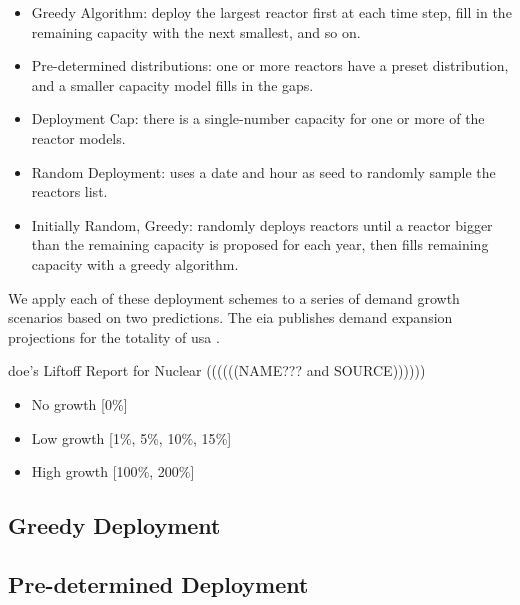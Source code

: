 \begin{itemize}
    \item Greedy Algorithm: deploy the largest reactor first at each time step, fill in the remaining capacity with the next smallest, and so on.
    \item Pre-determined distributions: one or more reactors have a preset distribution, and a smaller capacity model fills in the gaps.
    \item Deployment Cap: there is a single-number capacity for one or more of the reactor models.
    \item Random Deployment: uses a date and hour as seed to randomly sample the reactors list.
    \item Initially Random, Greedy: randomly deploys reactors until a reactor bigger than the remaining capacity is proposed for each year, then fills remaining capacity with a greedy algorithm.
\end{itemize}

We apply each of these deployment schemes to a series of demand growth scenarios based on two predictions. The \gls{eia} publishes demand expansion projections for the totality of \gls{usa} .


\gls{doe}'s Liftoff Report for Nuclear ((((((NAME??? and SOURCE)))))) \cite{}
\begin{itemize}
    \item No growth [0$\%$]
    \item Low growth [1$\%$, 5$\%$, 10$\%$, 15$\%$]
    \item High growth [100$\%$, 200$\%$]
\end{itemize}

\subsection{Greedy Deployment}




\subsection{Pre-determined Deployment}




